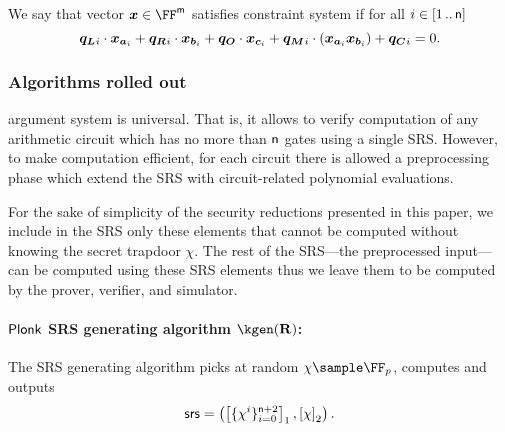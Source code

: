 \documentclass[runningheads,10pt]{llncs}
\begin{document}
We say that vector $\vx \in \FF^\noofw$ satisfies constraint system if for all $i
\in [1 \, .. \, \mathsf{n}]$
\[
  \vql_i \cdot \vx_{\va_i} + \vqr_i \cdot \vx_{\vb_i} + \vqo \cdot \vx_{\vc_i} +
  \vqm_i \cdot (\vx_{\va_i} \vx_{\vb_i}) + \vqc_i = 0. 
\]

\subsubsection{Algorithms rolled out}
\label{sec:plonk_explained}
\plonk{} argument system is universal. That is, it allows to verify computation
of any arithmetic circuit which has no more than $\mathsf{n}$
gates using a single SRS. However, to make computation efficient, for each
circuit there is allowed a preprocessing phase which extend the SRS with
circuit-related polynomial evaluations.

For the sake of simplicity of the security reductions presented in this paper, we
include in the SRS only these elements that cannot be computed without knowing
the secret trapdoor $\chi$. The rest of the SRS---the preprocessed input---can
be computed using these SRS elements thus we leave them to be computed by the
prover, verifier, and simulator.

\paragraph{$\textnormal{\textsf{Plonk}}$ SRS generating algorithm $\kgen(\REL)$:}
The SRS generating algorithm picks at random $\chi \sample \FF_p$, computes
and outputs
\[
	\mathsf{srs} = \left(\left[\{\chi^i\}_{i = 0}^{\mathsf{n} + 2}\right]_{1},
	\left[\chi\right]_{2} \right).
\]
\end{document}
